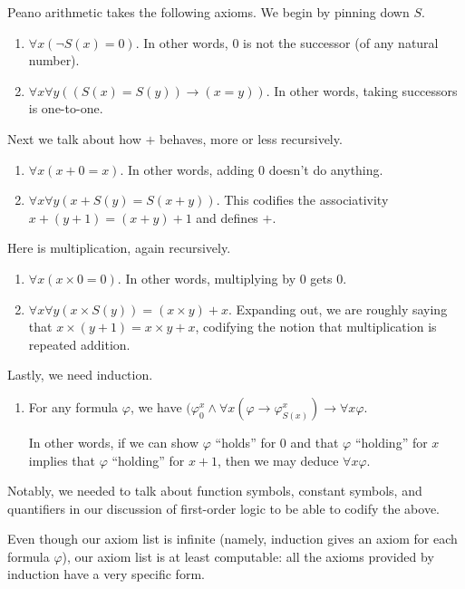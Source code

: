 \documentclass[../notes.tex]{subfiles}
\begin{document}
\begin{axiom}
	Peano arithmetic takes the following axioms. We begin by pinning down $S$.
	\begin{enumerate}[label=(S\arabic*)]
		\item $\forall x(\lnot S(x)=0)$. In other words, $0$ is not the successor (of any natural number).
		\item $\forall x\forall y((S(x)=S(y))\to (x=y))$. In other words, taking successors is one-to-one.
	\end{enumerate}
	Next we talk about how $+$ behaves, more or less recursively.
	\begin{enumerate}[label=(A\arabic*)]
		\item $\forall x(x+0=x)$. In other words, adding $0$ doesn't do anything.
		\item $\forall x\forall y(x+S(y)=S(x+y))$. This codifies the associativity $x+(y+1)=(x+y)+1$ and defines $+$.
	\end{enumerate}
	Here is multiplication, again recursively.
	\begin{enumerate}[label=(M\arabic*)]
		\item $\forall x(x\times0=0)$. In other words, multiplying by $0$ gets $0$.
		\item $\forall x\forall y(x\times S(y))=(x\times y)+x$. Expanding out, we are roughly saying that $x\times(y+1)=x\times y+x$, codifying the notion that multiplication is repeated addition.
	\end{enumerate}
	Lastly, we need induction.
	\begin{enumerate}[label=(IND)]
		\item For any formula $\varphi$, we have $(\varphi^x_0\land\forall x(\varphi\to\varphi^x_{S(x)})\to\forall x\varphi$.

		In other words, if we can show $\varphi$ ``holds'' for $0$ and that $\varphi$ ``holding'' for $x$ implies that $\varphi$ ``holding'' for $x+1$, then we may deduce $\forall x\varphi$.
	\end{enumerate}
\end{axiom}
Notably, we needed to talk about function symbols, constant symbols, and quantifiers in our discussion of first-order logic to be able to codify the above.
\begin{remark}
	Even though our axiom list is infinite (namely, induction gives an axiom for each formula $\varphi$), our axiom list is at least computable: all the axioms provided by induction have a very specific form.
\end{remark}
\end{document}
